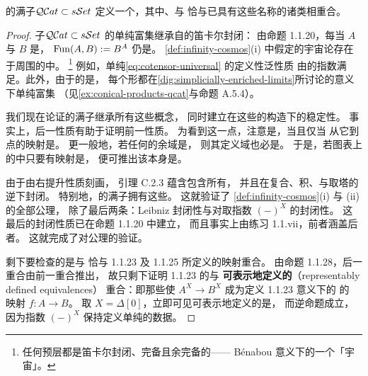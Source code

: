 \begin{proposition}\label{prop:cosmos-quasi-categories}
\trQuasiCategory{}的满子\trCategory $\mathcal{Q}\mathcal{C}at\subset s\mathcal{S}et$
定义一个\trInfinityCosmos{}，其中\trIsofibration{}、\trEquivalence{}与\trTrivialFibration{}%
恰与已具有这些名称的诸类相重合。
\end{proposition}
\begin{proof}
子\trCategory $\mathcal{Q}\mathcal{C}at\subset s\mathcal{S}et$ 的单纯富集继承自\trSimplicialSet{}的笛卡尔封闭\trCategory{}：
由命题 1.1.20，每当 $A$ 与 $B$ 是\trQuasiCategory{}， %
$\operatorname{Fun}(A,B):=B^A$ 仍是\trQuasiCategory{}。
\cref{def:infinity-cosmos}(i) 中假定的宇宙论\trLimit{}存在于周围的\trSimplicialSet\trCategory{}中。%
\footnote{任何预层\trCategory{}都是笛卡尔封闭、完备且余完备的——
Bénabou 意义下的一个「宇宙」。}
例如，单纯\trCotensor \eqref{eq:cotensor-universal} 的定义性泛性质
由\trSimplicialSet{}的指数满足。此外，由于\trSimplicialSet{}的\trCategory{}是\trCartesianClosed{}，
每个\trCone{}形\trLimit{}都在\cref{dig:simplicially-enriched-limits}所讨论的意义下单纯富集
（见\cref{ex:conical-products-qcat}与命题 A.5.4）。

我们现在论证\trQuasiCategory{}的满子\trCategory{}继承所有这些\trLimit{}概念，
同时建立\trIsofibration{}在这些\trLimit{}的构造下的稳定性。
事实上，后一性质有助于证明前一性质。
为看到这一点，注意\trSimplicialSet{}是\trQuasiCategory{}，当且仅当
从它到点的映射是\trIsofibration{}。
更一般地，若任何\trIsofibration{}的余域是\trQuasiCategory{}，
则其定义域也必是。
于是，若\trQuasiCategory{}图表上的\trLimit{}\trCone{}中只要有映射是\trIsofibration{}，
便可推出该\trLimit{}本身是\trQuasiCategory{}。

由于\trIsofibration{}由右提升性质刻画，
引理 C.2.3 蕴含\trIsofibration{}包含所有\trIsomorphism{}，
并且在复合、积、\trPullback{}与取塔的逆\trLimit{}下封闭。
特别地，\trQuasiCategory{}的满子\trCategory{}拥有这些\trLimit{}。
这就验证了 \cref{def:infinity-cosmos}(i) 与 (ii) 的全部公理，
除了最后两条：Leibniz 封闭性与对取指数 $(-)^X$ 的封闭性。
这最后的封闭性质已在命题 1.1.20 中建立， %
而且事实上由练习 1.1.vii，前者涵盖后者。
这就完成了对\trInfinityCosmos{}公理的验证。

剩下要检查的是\trEquivalence{}与\trTrivialFibration
恰与 1.1.23 及 1.1.25 所定义的映射重合。 %
由命题 1.1.28，后一重合由前一重合推出， %
故只剩下证明 1.1.23 的\trEquivalence{}与 %
\textbf{可表示地定义的\trEquivalence}（representably defined equivalences）
重合：即那些使 $A^X\to B^X$ 成为定义 1.1.23 意义下\trQuasiCategory{}的%
\trEquivalence{}的%
\trQuasiCategory{}映射 $f\colon A\to B$。
取 $X=\Delta[0]$，立即可见可表示地定义的\trEquivalence{}是\trEquivalence{}，
而逆命题成立，因为指数 $(-)^X$
保持定义单纯\trHomotopy{}的数据。
\end{proof}

